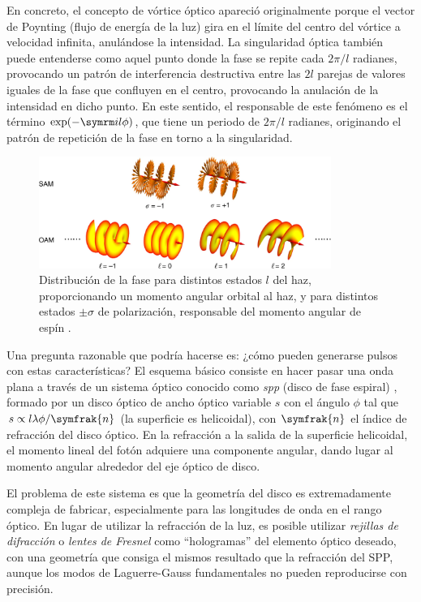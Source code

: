 En concreto, el concepto de vórtice óptico apareció originalmente \autocite{Shen2019} porque el vector de Poynting (flujo de energía de la luz) gira en el límite del centro del vórtice a velocidad infinita, anulándose la intensidad. La singularidad óptica también puede entenderse como aquel punto donde la fase se repite cada $2 \pi/l$ radianes, provocando un patrón de interferencia destructiva entre las $2l$ parejas de valores iguales de la fase que confluyen en el centro, provocando la anulación de la intensidad en dicho punto. En este sentido, el responsable de este fenómeno es el término $\exp(-\iu l \phi)$, que tiene un periodo de $2 \pi/l$ radianes, originando el patrón de repetición de la fase en torno a la singularidad.

\begin{figure}[htbp]
  \centering
  \includegraphics[width=0.85\textwidth]{Figuras/ch1_oam_sam.png}
  \caption{Distribución de la fase para distintos estados $l$ del haz, proporcionando un momento angular orbital al haz, y para distintos estados $\pm \sigma$ de polarización, responsable del momento angular de espín \autocite{Shen2019}.}
  \label{fig:1.13}
\end{figure}

Una pregunta razonable que podría hacerse es: ¿cómo pueden generarse pulsos con estas características? El esquema básico consiste en hacer pasar una onda plana a través de un sistema óptico conocido como \emph{\acrfull{spp}} (disco de fase espiral) \autocite{Yao2011}, formado por un disco óptico de ancho óptico variable $s$ con el ángulo $\phi$ tal que $s \propto l \lambda \phi/\symfrak{n}$ (la superficie es helicoidal), con $\symfrak{n}$ el índice de refracción del disco óptico. En la refracción a la salida de la superficie helicoidal, el momento lineal del fotón adquiere una componente angular, dando lugar al momento angular alrededor del eje óptico de disco. 

El problema de este sistema es que la geometría del disco es extremadamente compleja de fabricar, especialmente para las longitudes de onda en el rango óptico. En lugar de utilizar la refracción de la luz, es posible utilizar \emph{rejillas de difracción} o \emph{lentes de Fresnel} como \enquote{hologramas} del elemento óptico deseado, \autocite{Yao2011} con una geometría que consiga el mismos resultado que la refracción del SPP, aunque los modos de Laguerre-Gauss fundamentales no pueden reproducirse con precisión.

